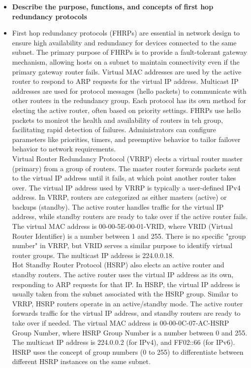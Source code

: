 \documentclass{article}
\begin{document}
\begin{itemize}
  \item \textbf{Describe the purpose, functions, and concepts of first hop redundancy protocols}
  	\item[] First hop redundancy protocols (FHRPs) are essential in network design to ensure high availability and redundancy for devices connected to the same subnet. The primary purpose of FHRPs is to provide a fault-tolerant gateway mechanism, allowing hosts on a subnet to maintain connectivity even if the primary gateway router fails. Virtual MAC addresses are used by the active router to respond to ARP requests for the virtual IP address. Multicast IP addresses are used for protocol messages (hello packets) to communicate with other routers in the redundancy group. Each protocol has its own method for electing the active router, often based on priority settings. FHRPs use hello packets to monirot the health and availability of routers in teh group, facilitating rapid detection of failures. Administrators can configure parameters like priorities, timers, and preemptive behavior to tailor failover behavior to network requirements.\\
	Virtual Router Redundancy Protocol (VRRP) elects a virtual router master (primary) from a group of routers. The master router forwards packets sent to the virtual IP address until it fails, at which point another router takes over. The virtual IP address used by VRRP is typically a user-defined IPv4 address. In VRRP, routers are categorized as either masters (active) or backups (standby). The active router handles traffic for the virtual IP address, while standby routers are ready to take over if the active router fails. The virtual MAC address is 00-00-5E-00-01-{VRID}, where VRID (Virtual Router Identifier) is a number between 1 and 255. There is no specific "group number" in VRRP, but VRID serves a similar purpose to identify virtual router groups. The multicast IP address is 224.0.0.18.\\
	Hot Standby Router Protocol (HSRP)  also elects an active router and standby routers. The active router uses the virtual IP address as its own, responding to ARP requests for that IP. In HSRP, the virtual IP address is usually taken from the subnet associated with the HSRP group. Similar to VRRP, HSRP routers operate in an active/standby mode. The active router forwards traffic for the virtual IP address, and standby routers are ready to take over if needed. The virtual MAC address is 00-00-0C-07-AC-{HSRP Group Number}, where HSRP Group Number is a number between 0 and 255. The multicast IP address is 224.0.0.2 (for IPv4), and FF02::66 (for IPv6). HSRP uses the concept of group numbers (0 to 255) to differentiate between different HSRP instances on the same subnet.\\

\end{itemize}
\end{document}
